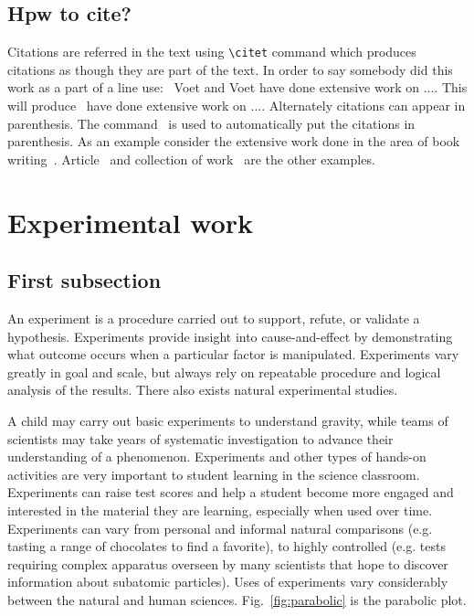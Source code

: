 \documentclass[11pt, a4paper]{article}
\begin{document}
\subsection{Hpw to cite?}
Citations are referred in the text using \verb|\citet| command which produces citations
as though they are part of the text. In order to say somebody did this work as a part of a line use:~ Voet and Voet have done extensive work on .... This will produce~\citet{voet2011biochemistry} have done extensive work on .... Alternately citations can appear in parenthesis. The command~\citep{voet2011biochemistry} is used to automatically put the citations in parenthesis. As an example consider the extensive work done in the area of book writing~\citep{seifert1991shape}.
Article~\citep{sircar1972adsorption,keh1995particle} and collection of work~\citep{seifert1995morphology} are the other examples.

\section{Experimental work}\label{sec:exp}

\subsection{First subsection}
An experiment is a procedure carried out to support, refute, or validate a hypothesis. Experiments provide insight into cause-and-effect by demonstrating what outcome occurs when a particular factor is manipulated. Experiments vary greatly in goal and scale, but always rely on repeatable procedure and logical analysis of the results. There also exists natural experimental studies.

A child may carry out basic experiments to understand gravity, while teams of scientists may take years of systematic investigation to advance their understanding of a phenomenon. Experiments and other types of hands-on activities are very important to student learning in the science classroom. Experiments can raise test scores and help a student become more engaged and interested in the material they are learning, especially when used over time. Experiments can vary from personal and informal natural comparisons (e.g. tasting a range of chocolates to find a favorite), to highly controlled (e.g. tests requiring complex apparatus overseen by many scientists that hope to discover information about subatomic particles). Uses of experiments vary considerably between the natural and human sciences. Fig.~\ref{fig:parabolic} is the parabolic plot.
\end{document}

